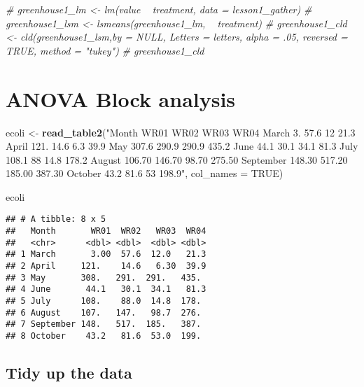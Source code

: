 \documentclass[]{book}
\newenvironment{Shaded}{\begin{snugshade}}{\end{snugshade}}
\newcommand{\CommentTok}[1]{\textcolor[rgb]{0.56,0.35,0.01}{\textit{#1}}}
\newcommand{\DataTypeTok}[1]{\textcolor[rgb]{0.13,0.29,0.53}{#1}}
\newcommand{\KeywordTok}[1]{\textcolor[rgb]{0.13,0.29,0.53}{\textbf{#1}}}
\newcommand{\NormalTok}[1]{#1}
\newcommand{\OtherTok}[1]{\textcolor[rgb]{0.56,0.35,0.01}{#1}}
\newcommand{\StringTok}[1]{\textcolor[rgb]{0.31,0.60,0.02}{#1}}
\theoremstyle{definition}
\theoremstyle{definition}
\theoremstyle{definition}
\theoremstyle{remark}
\begin{document}
\begin{Shaded}
\begin{Highlighting}[]
\CommentTok{# greenhouse1_lm <- lm(value ~ treatment, data = lesson1_gather)}
\CommentTok{# greenhouse1_lsm <- lsmeans(greenhouse1_lm, ~ treatment)}
\CommentTok{# greenhouse1_cld <- cld(greenhouse1_lsm,by = NULL, Letters = letters, alpha = .05, reversed = TRUE, method = "tukey")}
\CommentTok{# greenhouse1_cld}
\end{Highlighting}
\end{Shaded}

\hypertarget{anova-block-analysis}{%
\section{ANOVA Block analysis}\label{anova-block-analysis}}

\begin{Shaded}
\begin{Highlighting}[]
\NormalTok{ecoli <-}\StringTok{ }\KeywordTok{read_table2}\NormalTok{(}\StringTok{"Month  WR01  WR02  WR03  WR04}
\StringTok{March   3.  57.6    12  21.3}
\StringTok{April   121.    14.6    6.3 39.9}
\StringTok{May 307.6   290.9   290.9   435.2}
\StringTok{June    44.1    30.1    34.1    81.3}
\StringTok{July    108.1   88  14.8    178.2}
\StringTok{August  106.70  146.70  98.70   275.50}
\StringTok{September   148.30  517.20  185.00  387.30}
\StringTok{October 43.2    81.6    53  198.9"}\NormalTok{, }\DataTypeTok{col_names =} \OtherTok{TRUE}\NormalTok{)}

\NormalTok{ecoli}
\end{Highlighting}
\end{Shaded}

\begin{verbatim}
## # A tibble: 8 x 5
##   Month       WR01  WR02   WR03  WR04
##   <chr>      <dbl> <dbl>  <dbl> <dbl>
## 1 March       3.00  57.6  12.0   21.3
## 2 April     121.    14.6   6.30  39.9
## 3 May       308.   291.  291.   435. 
## 4 June       44.1   30.1  34.1   81.3
## 5 July      108.    88.0  14.8  178. 
## 6 August    107.   147.   98.7  276. 
## 7 September 148.   517.  185.   387. 
## 8 October    43.2   81.6  53.0  199.
\end{verbatim}

\hypertarget{tidy-up-the-data}{%
\subsection{Tidy up the data}\label{tidy-up-the-data}}
\end{document}
